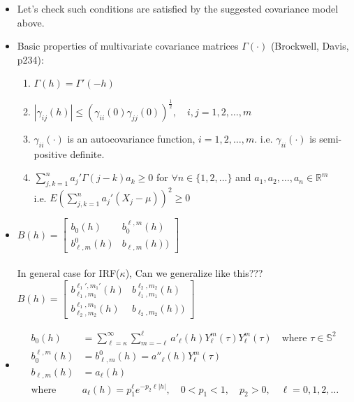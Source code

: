 \documentclass[11pt]{article}
\begin{document}
\begin{itemize}
\item Let's check such conditions are satisfied by the suggested covariance model above.\\

\item Basic properties of multivariate covariance matrices $\Gamma(\cdot)$ (Brockwell, Davis, p234):\\
\begin{enumerate}
\item $\Gamma(h)=\Gamma'(-h)$
\item $|\gamma_{ij}(h)| \le (\gamma_{ii}(0) \gamma_{jj}(0))^{\frac{1}{2}}, \quad i,j=1,2,\dots, m$
\item $\gamma_{ii}(\cdot)$ is an autocovariance function, $i=1,2,\dots,m$.
i.e. $\gamma_{ii}(\cdot)$ is semi-positive definite.
\item $\sum_{j,k=1}^n a_j' \Gamma(j-k) a_k \ge 0$ for $\forall n \in \{1,2,\dots\}$ and $a_1,a_2,\dots,a_n \in \mathbb{R}^m$\\
i.e. $E(\sum_{j,k=1}^n a_j '(X_j-\mu))^2 \ge 0$\\
\end{enumerate}

\item
$B(h)= 
\begin{bmatrix}
b_0(h) & b_0^{\ell,m}(h) \\ 
b_{\ell,m}^0(h) & b_{\ell,m}(h)) 
\end{bmatrix}$
\\\\
In general case for IRF($\kappa$), {\color{red} Can we generalize like this???}\\
$B(h)= 
\begin{bmatrix}
b_{\ell_1,m_1}^{\ell_1',m_1'}(h) & b_{\ell_1,m_1}^{\ell_2,m_2}(h) \\ 
b_{\ell_2,m_2}^{\ell_1,m_1}(h) & b_{\ell_2,m_2}(h)) 
\end{bmatrix}$

\item
\begin{align*}
b_0(h) &= \sum_{\ell=\kappa}^{\infty} \sum_{m=-\ell}^{\ell} a'_{\ell}(h) Y_{\ell}^{m}(\tau) Y_{\ell}^{m}(\tau)  \quad \text{where } \tau \in \mathbb{S}^2 \\
b_{0}^{\ell,m}(h) &= b_{\ell,m}^{0}(h) = a''_{\ell}(h) Y_{\ell}^{m}(\tau)\\
b_{\ell,m}(h) &= a_{\ell}(h)\\
\text{where } \quad &a_\ell(h)=p_1^\ell e^{-p_2 \ell |h|}, \quad 0<p_1<1, \quad p_2>0, \quad \ell=0,1,2,\dots\\
\end{align*}


\end{itemize}
\end{document}
